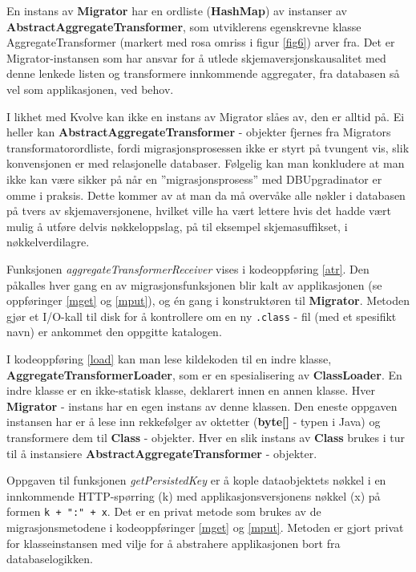 En instans av \textbf{Migrator} har en ordliste (\textbf{HashMap}) av instanser av \textbf{AbstractAggregateTransformer}, som utviklerens egenskrevne klasse AggregateTransformer (markert med rosa omriss i figur \ref{fig6}) arver fra. Det er Migrator-instansen som har ansvar for å utlede skjemaversjonskausalitet med denne lenkede listen og transformere innkommende aggregater, fra databasen så vel som applikasjonen, ved behov.

I likhet med Kvolve kan ikke en instans av Migrator slåes av, den er alltid på. Ei heller kan \textbf{AbstractAggregateTransformer} - objekter fjernes fra Migrators transformator\-ordliste, fordi migrasjonsprosessen ikke er styrt på tvungent vis, slik konvensjonen er med relasjonelle databaser. Følgelig kan man konkludere at man ikke kan være sikker på når en ''migrasjonsprosess'' med DBUpgradinator er omme i praksis. Dette kommer av at man da må overvåke alle nøkler i databasen på tvers av skjemaversjonene, hvilket ville ha vært lettere hvis det hadde vært mulig å utføre delvis nøkkeloppslag, på til eksempel skjemasuffikset, i nøkkelverdi\-lagre.



Funksjonen \emph{aggregateTransformerReceiver} vises i kodeoppføring \ref{atr}. Den påkalles hver gang en av migrasjonsfunksjonen blir kalt av applikasjonen (se oppføringer \ref{mget} og \ref{mput}), og én gang i konstruktøren til \textbf{Migrator}. Metoden gjør et I/O-kall til disk for å kontrollere om en ny \texttt{.class} - fil (med et spesifikt navn) er ankommet den oppgitte katalogen.



I kodeoppføring \ref{load} kan man lese kildekoden til en indre klasse, \textbf{AggregateTransformerLoader}, som er en spesialisering av \textbf{ClassLoader}. En indre klasse er en ikke-statisk klasse, deklarert innen en annen klasse. Hver \textbf{Migrator} - instans har en egen instans av denne klassen. Den eneste oppgaven instansen har er å lese inn rekkefølger av oktetter (\textbf{byte[]} - typen i Java) og transformere dem til \textbf{Class} - objekter. Hver en slik instans av \textbf{Class} brukes i tur til å instansiere \textbf{AbstractAggregateTransformer} - objekter.



Oppgaven til funksjonen \emph{getPersistedKey} er å kople dataobjektets nøkkel i en innkommende HTTP-spørring (k) med applikasjonsversjonens nøkkel (x) på formen \texttt{k + ":" + x}. Det er en privat metode som brukes av de migrasjonsmetodene i kodeoppføringer \ref{mget} og \ref{mput}. Metoden er gjort privat for klasseinstansen med vilje for å abstrahere applikasjonen bort fra databaselogikken.


